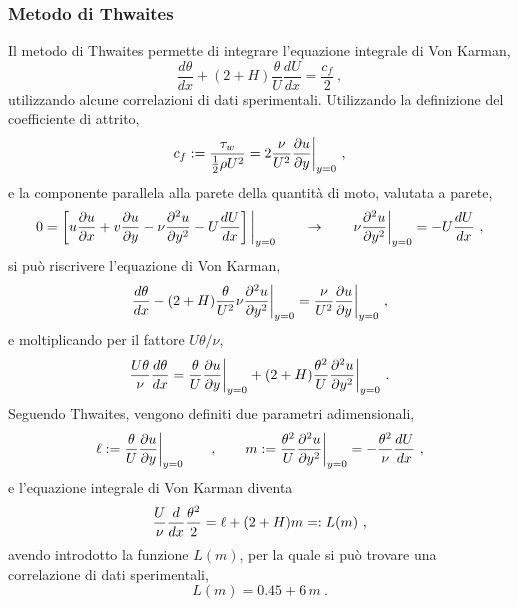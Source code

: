 \subsubsection{Metodo di Thwaites}
Il metodo di Thwaites permette di integrare l'equazione integrale di Von Karman,
\begin{equation}
\dfrac{d \theta}{dx} + \left( 2 + H \right) \dfrac{\theta}{U} \dfrac{d U}{dx} = \dfrac{c_f}{2} \ ,
\end{equation}
utilizzando alcune correlazioni di dati sperimentali. Utilizzando la definizione del coefficiente di attrito,
\begin{equation}
 c_f := \dfrac{\tau_w}{\frac{1}{2}\rho U^2} = 2 \dfrac{\nu}{U^2} \dfrac{\partial u}{\partial y}\bigg|_{y=0} \ ,
\end{equation}
e la componente parallela alla parete della quantità di moto, valutata a parete,
\begin{equation}
0 = \left[ u\dfrac{\partial u}{\partial x} + v\dfrac{\partial u}{\partial y} - \nu \dfrac{\partial^2 u}{\partial y^2} - U \dfrac{dU}{dx}\right]\bigg|_{y=0} \qquad \rightarrow \qquad \nu \dfrac{\partial^2 u}{\partial y^2}\bigg|_{y=0} = - U \dfrac{dU}{dx}  \ ,
\end{equation}
si può riscrivere l'equazione di Von Karman,
\begin{equation}
 \dfrac{d\theta}{dx} - (2+H) \dfrac{\theta}{U^2} \nu \dfrac{\partial^2 u}{\partial y^2}\bigg|_{y=0} =
 \dfrac{\nu}{U^2} \dfrac{\partial u}{\partial y}\bigg|_{y=0} \ ,
\end{equation}
e moltiplicando per il fattore $U \theta / \nu$,
\begin{equation}
 \dfrac{U \theta}{\nu} \dfrac{d\theta}{dx} =
 \dfrac{\theta}{U}\dfrac{\partial u}{\partial y}\bigg|_{y=0} + (2+H) \dfrac{\theta^2}{U} \dfrac{\partial^2 u}{\partial y^2}\bigg|_{y=0} \ .
\end{equation}
Seguendo Thwaites, vengono definiti due parametri adimensionali,
\begin{equation}
 \ell := \dfrac{\theta}{U}\dfrac{\partial u}{\partial y}\bigg|_{y=0} 
 \qquad , \qquad
    m := \dfrac{\theta^2}{U} \dfrac{\partial^2 u}{\partial y^2}\bigg|_{y=0}
       = - \dfrac{\theta^2}{\nu}\dfrac{dU}{dx} \ ,
\end{equation}
e l'equazione integrale di Von Karman diventa
\begin{equation}
 \dfrac{U}{\nu} \dfrac{d}{dx}\dfrac{\theta^2}{2} = \ell + ( 2 + H ) m =: L(m) \ ,
\end{equation}
avendo introdotto la funzione $L(m)$, per la quale si può trovare una correlazione di dati sperimentali,
\begin{equation}
 L(m) = 0.45 + 6 \, m  \ .
\end{equation}

